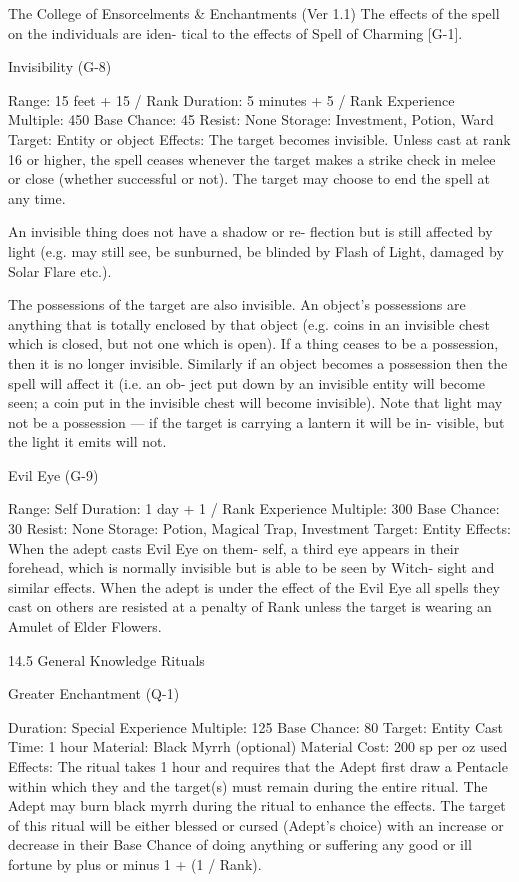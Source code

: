 \begin{Chapter}{The College of Ensorcelments \& Enchantments (Ver 1.1)}
The effects of the spell on the individuals are iden-
tical to the effects of Spell of Charming [G-1]. 

Invisibility (G-8) 

Range: 15 feet + 15 / Rank 
Duration: 5 minutes + 5 / Rank 
Experience Multiple: 450 
Base Chance: 45%
Resist: None 
Storage: Investment, Potion, Ward 
Target: Entity or object 
Effects:  The  target  becomes  invisible.  Unless  cast 
at rank 16 or higher, the spell ceases whenever the 
target  makes  a  strike  check  in  melee  or  close 
(whether successful or not). The target may choose 
to end the spell at any time. 

An  invisible  thing  does  not  have  a  shadow  or  re-
flection  but  is  still  affected  by  light  (e.g.  may  still 
see,  be  sunburned,  be  blinded  by  Flash  of  Light, 
damaged by Solar Flare etc.).  

The possessions of the target are also invisible. An 
object’s  possessions  are  anything  that  is  totally 
enclosed  by  that  object  (e.g.  coins  in  an  invisible 
chest  which  is  closed, but not  one  which  is  open). 
If  a  thing  ceases  to  be  a  possession,  then  it  is  no 
longer  invisible.  Similarly  if  an  object  becomes  a 
possession  then  the  spell  will  affect  it  (i.e.  an  ob-
ject  put  down  by  an  invisible  entity  will  become 
seen; a coin put in the invisible chest will become 
invisible). Note that light may not be a possession 
—  if  the  target  is  carrying  a  lantern  it  will  be  in-
visible, but the light it emits will not. 

Evil Eye (G-9) 

Range: Self 
Duration: 1 day + 1 / Rank 
Experience Multiple: 300 
Base Chance: 30%
Resist: None 
Storage: Potion, Magical Trap, Investment 
Target: Entity  
Effects:  When  the  adept  casts  Evil  Eye  on  them-
self, a third eye appears in their forehead, which is 
normally invisible but is able to be seen by Witch-
sight  and  similar  effects.  When  the  adept  is  under 
the  effect  of  the  Evil  Eye  all  spells  they  cast  on 
others  are  resisted  at  a  penalty  of  Rank  unless  the 
target is wearing an Amulet of Elder Flowers. 

14.5 General Knowledge Rituals 

Greater Enchantment (Q-1) 

Duration: Special 
Experience Multiple: 125 
Base Chance: 80%
Target: Entity 
Cast Time: 1 hour 
Material: Black Myrrh (optional) 
Material Cost: 200 sp per oz used 
Effects:  The  ritual  takes  1  hour  and  requires  that 
the  Adept  first  draw  a  Pentacle  within  which  they 
and  the  target(s)  must  remain  during  the  entire 
ritual. The Adept may burn black myrrh during the 
ritual  to  enhance  the  effects.  The  target  of  this 
ritual  will  be  either  blessed  or  cursed  (Adept’s 
choice)  with  an  increase  or  decrease  in  their  Base 
Chance of doing anything or suffering any good or 
ill fortune by plus or minus 1 + (1 / Rank). 


\end{Chapter}
